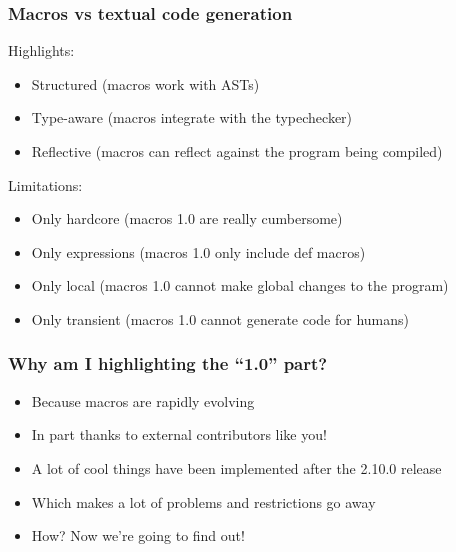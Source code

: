 \documentclass[svgnames,hyperref={bookmarks=false}]{beamer}
\begin{document}
\begin{frame}[fragile]
\frametitle{Macros vs textual code generation}

Highlights:
\begin{itemize}
\item Structured (macros work with ASTs)
\item Type-aware (macros integrate with the typechecker)
\item Reflective (macros can reflect against the program being compiled)
\end{itemize}

\pause
\vskip15pt
Limitations:
\begin{itemize}
\item Only hardcore (macros 1.0 are really cumbersome)
\item Only expressions (macros 1.0 only include def macros)
\item Only local (macros 1.0 cannot make global changes to the program)
\item Only transient (macros 1.0 cannot generate code for humans)
\end{itemize}
\end{frame}

\begin{frame}[fragile]
\frametitle{Why am I highlighting the ``1.0'' part?}

\begin{itemize}
\item Because macros are rapidly evolving
\item In part thanks to external contributors like you!
\item A lot of cool things have been implemented after the 2.10.0 release
\item Which makes a lot of problems and restrictions go away
\item How? Now we're going to find out!
\end{itemize}
\end{frame}

\begin{frame}[fragile]
\frametitle{}

\vskip40pt
\begin{center}
\end{center}
\end{frame}
\end{document}

